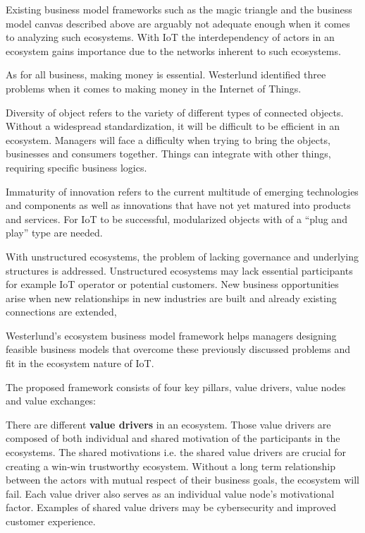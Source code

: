 		Existing business model frameworks such as the magic triangle and the business model canvas described above are arguably not adequate enough when it comes to analyzing such ecosystems. With IoT the interdependency of actors in an ecosystem gains importance due to the networks inherent to such ecosystems.

		As for all business, making money is essential. Westerlund identified three problems when it comes to making money in the Internet of Things.

		Diversity of object refers to the variety of different types of connected objects. Without a widespread standardization, it will be difficult to be efficient in an ecosystem. Managers will face a difficulty when trying to bring the objects, businesses and consumers together. Things can integrate with other things, requiring specific business logics.

		Immaturity of innovation refers to the current multitude of emerging technologies and components as well as innovations that have not yet matured into products and services. For IoT to be successful, modularized objects with of a ``plug and play'' type are needed.

		With unstructured ecosystems, the problem of lacking governance and underlying structures is addressed. Unstructured ecosystems may lack essential participants for example IoT operator or potential customers. New business opportunities arise when new relationships in new industries are built and already existing connections are extended,

		Westerlund's ecosystem business model framework helps managers designing feasible business models that overcome these previously discussed problems and fit in the ecosystem nature of IoT. 

		The proposed framework consists of four key pillars, value drivers, value nodes and value exchanges:

		There are different \textbf{value drivers} in an ecosystem. Those value drivers are composed of both individual and shared motivation of the participants in the ecosystems. The shared motivations i.e. the shared value drivers are crucial for creating a win-win trustworthy ecosystem. Without a long term relationship between the actors with mutual respect of their business goals, the ecosystem will fail. Each value driver also serves as an individual value node's motivational factor. Examples of shared value drivers may be cybersecurity and improved customer experience.

